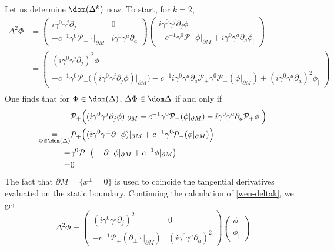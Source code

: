 Let us determine $\dom (\Delta^k)$ now. 
To start, for $k =2$,
\begin{equation}\label{wen-deltak}
\begin{split}
\Delta^2 \Phi & =  
\begin{pmatrix} i \gamma^0 \gamma^j \partial_j & 0 \\
- c^{-1} \gamma^0 \mathcal{P}_- \cdot \vert_{\partial M} & i \gamma^0 \gamma^a \partial_a \end{pmatrix}
\begin{pmatrix}   i \gamma^0 \gamma^j \partial_j \phi \\
- c^{-1} \gamma^0 \mathcal{P}_- \phi\vert_{\partial M} + i \gamma^0 \gamma^a \partial_a  \phi_| \end{pmatrix} \\
&= 
\begin{pmatrix} (i\gamma^0\gamma^j\partial_j)^2 \phi \\
-c^{-1}\gamma^0\mathcal{P}_- \big( (i\gamma^0\gamma^j\partial_j \phi)\vert_{\partial M}\big)
-c^{-1}i \gamma^0\gamma^a\partial_a \mathcal{P}_+ \gamma^0 \mathcal{P}_-(\phi\vert_{\partial M})
+ (i\gamma^0\gamma^a\partial_a)^2\phi_| \end{pmatrix}
\\
\end{split}
\end{equation}
One finds that for $\Phi \in \dom(\Delta)$, $\Delta \Phi \in \dom \Delta$ if and only if
\begin{equation*}
\begin{split}
&\mathcal{P}_+\Big( ( i\gamma^0\gamma^j \partial_j \phi ) \vert_{\partial M} +
 c^{-1}\gamma^0 \mathcal{P}_- ( \phi \vert_{\partial M})
- i \gamma^0 \gamma^a \partial_a \mathcal{P}_+\phi _| \Big) \\
\underset{\Phi\in \dom(\Delta)}{ = }& 
\mathcal{P}_+\Big( (i\gamma^0\gamma^\bot \partial_\bot\phi)\vert_{\partial M} +
c^{-1}\gamma^0 \mathcal{P}_- ( \phi \vert_{\partial M}) \Big) \\ 
= & 
\gamma^0\mathcal{P}_-\big(- \partial_\bot \phi \vert_{\partial M} + c^{-1} \phi\vert_{\partial M}\big)
\\ = & 0
\end{split}
\end{equation*}
The fact that $\partial M = \{x^\bot = 0\}$ is used to coincide the tangential derivatives evaluated on the static boundary.
Continuing the calculation of \cref{wen-deltak}, we get
\begin{equation}\label{wen-delta2}
\Delta^2 \Phi = \begin{pmatrix} (i \gamma^0 \gamma^j\partial_j)^2 & 0 \\ 
- c^{-1}\mathcal{P}_+( \partial_\bot \cdot\vert_{\partial M} ) & 
(i \gamma^0 \gamma^a \partial_a)^2 \end{pmatrix}
\begin{pmatrix} \phi \\ \phi_| \end{pmatrix}
\end{equation}
